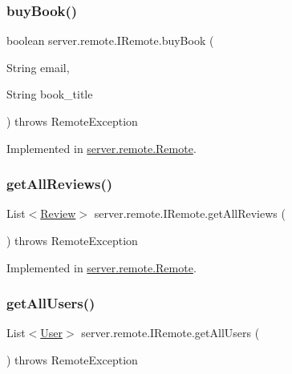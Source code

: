 \subsubsection{\texorpdfstring{buy\+Book()}{buyBook()}}
{\footnotesize\ttfamily boolean server.\+remote.\+I\+Remote.\+buy\+Book (\begin{DoxyParamCaption}\item[{String}]{email,  }\item[{String}]{book\+\_\+title }\end{DoxyParamCaption}) throws Remote\+Exception}



Implemented in \hyperlink{classserver_1_1remote_1_1_remote_af5d1abb1730b8db14ab9dd476df158d8}{server.\+remote.\+Remote}.

\mbox{\label{interfaceserver_1_1remote_1_1_i_remote_a017e07cb93ae582188c20d7b1ce6b014}} 
\subsubsection{\texorpdfstring{get\+All\+Reviews()}{getAllReviews()}}
{\footnotesize\ttfamily List$<$\hyperlink{classserver_1_1data_1_1_review}{Review}$>$ server.\+remote.\+I\+Remote.\+get\+All\+Reviews (\begin{DoxyParamCaption}{ }\end{DoxyParamCaption}) throws Remote\+Exception}



Implemented in \hyperlink{classserver_1_1remote_1_1_remote_a22538e64b45f5f93237b455100243b44}{server.\+remote.\+Remote}.

\mbox{\label{interfaceserver_1_1remote_1_1_i_remote_a3ff8752a1911b6ca54fc4a04af90fe7a}} 
\subsubsection{\texorpdfstring{get\+All\+Users()}{getAllUsers()}}
{\footnotesize\ttfamily List$<$\hyperlink{classserver_1_1data_1_1_user}{User}$>$ server.\+remote.\+I\+Remote.\+get\+All\+Users (\begin{DoxyParamCaption}{ }\end{DoxyParamCaption}) throws Remote\+Exception}



